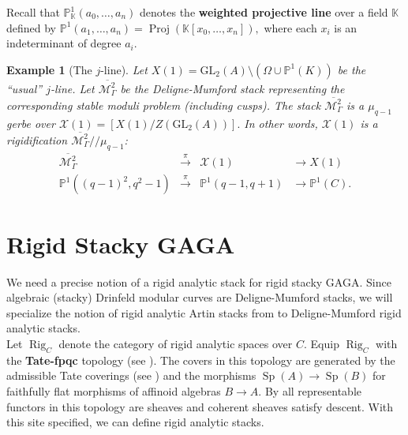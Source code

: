\documentclass[11pt]{amsart}
\newtheorem{example}[theorem]{Example}
\newtheorem{remark}[theorem]{Remark}
\theoremstyle{definition}
\numberwithin{equation}{section}
\newcommand{\Proj}{\operatorname{Proj}} 	%
\newcommand{\GL}{\mathrm{GL}} 	%
\newcommand{\cM}{\mathcal{M}}		%
\newcommand{\sX}{\mathscr{X}}		%
\newcommand{\bbF}{\mathbb{F}}		%
\newcommand{\bbK}{\mathbb{K}}		%
\newcommand{\bbP}{\mathbb{P}}		%
\begin{document}
		Recall that $\bbP_{\bbK}^1(a_0,\ldots, a_n)$ denotes the \textbf{weighted projective line} over a field $\bbK$ defined by $\displaystyle{\bbP^1(a_1,\ldots, a_n)=\Proj(\bbK[x_0,\ldots, x_n])},$ where each $x_i$ is an indeterminant of degree $a_i.$
		
		\begin{example}[The $j$-line]
			Let $X(1)=\GL_2(A)\setminus(\Omega\cup\bbP^1(K))$ be the ``usual'' $j$-line. Let $\overline{\cM^2_{\Gamma}}$ be the Deligne-Mumford stack representing the corresponding stable moduli problem (including cusps). The stack $\overline{\cM^2_{\Gamma}}$ is a $\mu_{q-1}$ gerbe over $\sX(1)=[X(1)/Z(\GL_2(A))].$ In other words, $\sX(1)$ is a rigidification $\overline{\cM^2_{\Gamma}}/\!/\mu_{q-1}$: 
			\[\begin{array}{cccl}
				\overline{\cM^2_{\Gamma}}&\overset{\pi}{\to}&\sX(1)&\to X(1)\\
				\bbP^1((q-1)^2,q^2-1)&\overset{\pi}{\to}&\bbP^1(q-1,q+1)&\to\bbP^1(C).
			\end{array}\]
		\end{example}
		
		
		\section{Rigid Stacky GAGA}
		
		We need a precise notion of a rigid analytic stack for rigid stacky GAGA. Since algebraic (stacky) Drinfeld modular curves are Deligne-Mumford stacks, we will specialize the notion of rigid analytic Artin stacks from \cite[Section $5.1.7$]{Emerton-Gee-Hellman-categorical-p-adic-langlands} to Deligne-Mumford rigid analytic stacks.\\
		
		Let $\operatorname{Rig}_C$ denote the category of rigid analytic spaces over $C.$ Equip $\operatorname{Rig}_C$ with the \textbf{Tate-fpqc} topology (see \cite[$2.1$]{Conrad-Temkin-nonarhimedean-analytification-alg-spaces}). The covers in this topology are generated by the admissible Tate coverings (see \cite[Section $4.2$]{Frensel-vanderPut-Rigid-Analytic_Geom}) and the morphisms $\operatorname{Sp}(A)\to \operatorname{Sp}(B)$ for faithfully flat morphisms of affinoid algebras $B\to A.$ By \cite[Theorem $4.2.8$]{Conrad-ampleness-rigid-geom} all representable functors in this topology are sheaves and coherent sheaves satisfy descent. With this site specified, we can define rigid analytic stacks.
		
\end{document}
